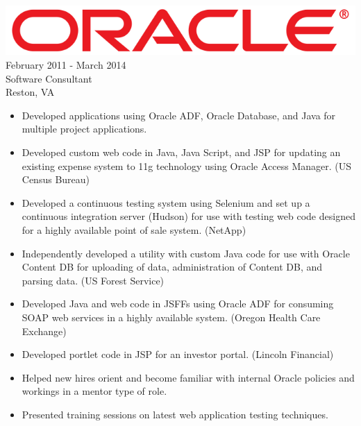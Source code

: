 \documentclass[12pt, line, margin]{res}
\begin{document}
\begin{resume}
                {\sl \includegraphics[scale=0.1]{resume_images/663px-Oracle_logo.png}} \hfill            February 2011 - March 2014 \\
                Software Consultant \\ Reston, VA
                \begin{itemize}  \itemsep -2pt %
                 \item Developed applications using Oracle ADF,
                               Oracle Database, and Java for multiple project applications.
	      \item Developed custom web code in Java, Java Script, and JSP for \newline 
                               updating an existing expense system to 11g technology using \newline 
                               Oracle Access Manager. (US Census Bureau)
	      \item Developed a continuous testing system using Selenium
                               and set up a continuous integration server (Hudson)
                               for use with testing web code designed for a
                               highly available point of sale system. (NetApp)
	      \item Independently developed a utility with custom Java code for use with
                               Oracle Content DB for uploading of data, administration
                               of Content DB, and parsing data.
                               (US Forest Service)
      	      \item Developed Java and web code in JSFFs using Oracle ADF for \newline
                               consuming SOAP web services in a highly available system. \newline 
                               (Oregon Health Care Exchange)
	      \item Developed portlet code in JSP for an investor portal. \newline
                               (Lincoln Financial)
	      \item Helped new hires orient and become familiar with internal 
                               Oracle policies and workings in a mentor type of role.
	      \item Presented training sessions on latest web application testing \newline
                               techniques.
                 \end{itemize} 


\end{resume}
\end{document}
